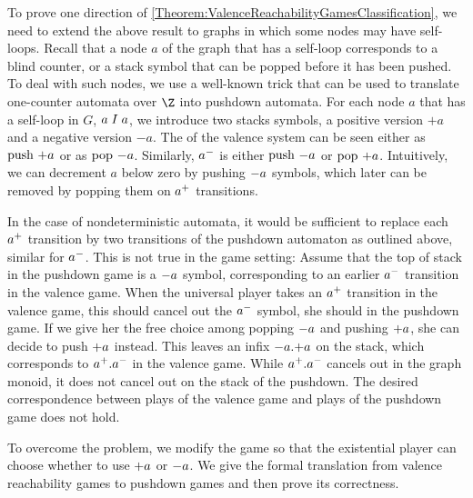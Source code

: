 \documentclass[../../diss.tex]{subfiles}
\begin{document}
To prove one direction of \cref{Theorem:ValenceReachabilityGamesClassification}, we need to extend the above result to graphs in which some nodes may have self-loops.
Recall that a node $a$ of the graph that has a self-loop corresponds to a blind counter, or a stack symbol that can be popped before it has been pushed.
To deal with such nodes, we use a well-known trick that can be used to translate one-counter automata over $\Z$ into pushdown automata.
For each node $a$ that has a self-loop in $G$, $a \mathrel{I} a$, we introduce two stacks symbols, a positive version $+a$ and a negative version $-a$.
The  of the valence system can be seen either as $\pushop \plusop{a}$ or as $\popop \minusop{a}$.
Similarly, ${a}^-$ is either $\pushop \minusop{a}$ or $\popop \plusop{a}$.
Intuitively, we can decrement $a$ below zero by pushing $\minusop{a}$ symbols, which later can be removed by popping them on ${a}^+$ transitions.

In the case of nondeterministic automata, it would be sufficient to replace each ${a}^+$ transition by two transitions of the pushdown automaton as outlined above, similar for ${a}^-$.
This is not true in the game setting:
Assume that the top of stack in the pushdown game is a $\minusop{a}$ symbol, corresponding to an earlier ${a}^-$ transition in the valence game.
When the universal player takes an ${a}^+$ transition in the valence game, this should cancel out the ${a}^-$ symbol, \ie she should  in the pushdown game.
If we give her the free choice among popping $\minusop{a}$ and pushing $\plusop{a}$, she can decide to push $\plusop{a}$ instead.
This leaves an infix $\minusop{a}.\plusop{a}$ on the stack, which corresponds to ${a}^+.{a}^-$ in the valence game.
While ${a}^+.{a}^-$ cancels out in the graph monoid, it does not cancel out on the stack of the pushdown.
The desired correspondence between plays of the valence game and plays of the pushdown game does not hold.

To overcome the problem, we modify the game so that the existential player can choose whether to use $\plusop{a}$ or $\minusop{a}$.
We give the formal translation from valence reachability games to pushdown games and then prove its correctness.
\end{document}
